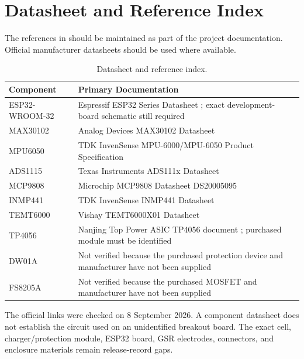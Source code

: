 \section{Datasheet and Reference Index}
\label{sec:datasheet-reference-index}

The references in  should be maintained as part of the project documentation. Official manufacturer datasheets should be used where available.

\begin{table}[t]
\centering
\caption{Datasheet and reference index.}
\label{tab:datasheet-index}
\small
\begin{tabularx}{\textwidth}{@{}l Y@{}}
\toprule
\textbf{Component} & \textbf{Primary Documentation} \\
\midrule
ESP32-WROOM-32 & Espressif ESP32 Series Datasheet \cite{espressif_esp32_2026}; exact development-board schematic still required \\
MAX30102 & Analog Devices MAX30102 Datasheet \cite{adi_max30102_2018} \\
MPU6050 & TDK InvenSense MPU-6000/MPU-6050 Product Specification \cite{tdk_mpu6050_2013} \\
ADS1115 & Texas Instruments ADS111x Datasheet \cite{ti_ads1115_2025} \\
MCP9808 & Microchip MCP9808 Datasheet DS20005095 \cite{microchip_mcp9808} \\
INMP441 & TDK InvenSense INMP441 Datasheet \cite{tdk_inmp441_2014} \\
TEMT6000 & Vishay TEMT6000X01 Datasheet \cite{vishay_temt6000_2011} \\
TP4056 & Nanjing Top Power ASIC TP4056 document \cite{toppower_tp4056}; purchased module must be identified \\
DW01A & Not verified because the purchased protection device and manufacturer have not been supplied \\
FS8205A & Not verified because the purchased MOSFET and manufacturer have not been supplied \\
\bottomrule
\end{tabularx}
\end{table}

The official links were checked on 8 September 2026. A component datasheet does not establish the circuit used on an unidentified breakout board. The exact cell, charger/protection module, ESP32 board, GSR electrodes, connectors, and enclosure materials remain release-record gaps.
